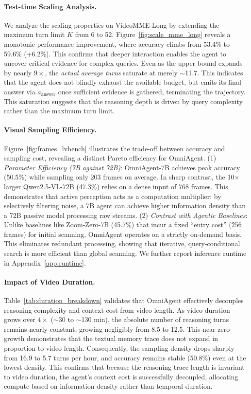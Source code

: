 \documentclass{article}
\theoremstyle{plain}
\theoremstyle{definition}
\theoremstyle{remark}
\begin{document}
\paragraph{Test-time Scaling Analysis.}
\label{sec:test_time_scaling}
We analyze the scaling properties on VideoMME-Long by extending the maximum turn limit $K$ from 6 to 52. Figure~\ref{fig:scale_mme_long} reveals a monotonic performance improvement, where accuracy climbs from 53.4\% to 59.6\% (+6.2\%). This confirms that deeper interaction enables the agent to uncover critical evidence for complex queries. 
Even as the upper bound expands by nearly $9\times$, the \textit{actual
average turns} saturate at merely $\sim$11.7. This indicates that the
agent does not blindly exhaust the available budget, but emits its final
answer via $a_{\text{answer}}$ once sufficient evidence is gathered,
terminating the trajectory.
This saturation suggests that the reasoning depth is driven by query complexity rather than the maximum turn limit.


\paragraph{Visual Sampling Efficiency.}
\label{sec:efficiency}
Figure~\ref{fig:frames_lvbench} illustrates the trade-off between accuracy and sampling cost, revealing a distinct Pareto efficiency for OmniAgent.
(1) \textit{Parameter Efficiency (7B against 72B)}: OmniAgent-7B achieves peak accuracy (50.5\%) while sampling only 203 frames on average. In sharp contrast, the 10$\times$ larger Qwen2.5-VL-72B (47.3\%) relies on a dense input of 768 frames. This demonstrates that active perception acts as a computation multiplier: by selectively filtering noise, a 7B agent can achieve higher information density than a 72B passive model processing raw streams.
(2) \textit{Contrast with Agentic Baselines}: Unlike baselines like Zoom-Zero-7B (45.7\%) that incur a fixed ``entry cost'' (256 frames) for initial scanning, OmniAgent operates on a strictly on-demand basis. This eliminates redundant processing, showing that iterative, query-conditional search is more efficient than global scanning. We further report inference runtime in Appendix~\ref{app:runtime}.


\paragraph{Impact of Video Duration.}
\label{sec:duration}
Table~\ref{tab:duration_breakdown} validates that OmniAgent effectively decouples reasoning complexity and context cost from video length. As video duration grows over $4\times$ ($\sim$30 to $\sim$130 min), the absolute number of reasoning turns remains nearly constant, growing negligibly from 8.5 to 12.5. This near-zero growth demonstrates that the textual memory trace does not expand in proportion to video length. Consequently, the sampling density drops sharply from 16.9 to 5.7 turns per hour, and accuracy remains stable (50.8\%) even at the lowest density. This confirms that because the reasoning trace length is invariant to video duration, the agent's context cost is successfully decoupled, allocating compute based on information density rather than temporal duration. 
\end{document}
